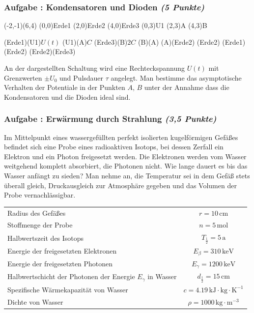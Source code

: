 \documentclass[12pt,a4paper]{article}
\newcommand{\unit}[1]{\,\mathrm{#1}}
\newcommand{\skizze}[1]{
\begin{center}
#1
\end{center}
}
\newcounter{numlabel}
\newenvironment{problem}[2]{\stepcounter{numlabel} \vspace{1ex} \subsubsection*{Aufgabe \the\value{numlabel}: #1 \emph{(#2 Punkte)}} \renewcommand{\Currentlabel}{Aufgabe \the\value{numlabel}: #1}}{

}
\begin{document}
\begin{problem}{Kondensatoren und Dioden}{5}
\skizze{
\begin{pspicture}(-2,-1)(6,4)
\pnode(0,0){Erde1}
\pnode(2,0){Erde2}
\pnode(4,0){Erde3}
\pnode(0,3){U1}
\pnode(2,3){A}
\pnode(4,3){B}

\tension[labeloffset=1](Erde1)(U1){$U(t)$}
\capacitor[labeloffset=-1](U1)(A){$C$}
\capacitor[labeloffset=-1](Erde3)(B){$2 C$}
\diode(B)(A){}
\diode(A)(Erde2){}
\ground(Erde2)
\wire(Erde1)(Erde2)
\wire(Erde2)(Erde3)
\nput{90}{A}{$A$}
\nput{90}{B}{$B$}
\end{pspicture}
}
An der dargestellten Schaltung wird eine Rechteckspannung $U(t)$ mit Grenzwerten $\pm U_0$ und Pulsdauer $\tau$ angelegt. Man bestimme das asymptotische Verhalten der Potentiale in der Punkten $A$, $B$ unter der Annahme dass die Kondensatoren und die Dioden ideal sind.
\end{problem}

\begin{problem}{Erwärmung durch Strahlung}{3,5}
Im Mittelpunkt eines wassergefüllten perfekt isolierten kugelförmigen Gefäßes befindet sich eine Probe eines radioaktiven Isotops, bei dessen Zerfall ein Elektron und ein Photon freigesetzt werden. Die Elektronen werden vom Wasser weitgehend komplett absorbiert, die Photonen nicht. Wie lange dauert es bis das Wasser anfängt zu sieden? Man nehme an, die Temperatur sei in dem Gefäß stets überall gleich, Druckausgleich zur Atmosphäre gegeben und das Volumen der Probe vernachlässigbar.
\begin{center}
\begin{tabular}{lc}
\toprule
Radius des Gefäßes & $r = 10 \unit{cm}$\\
Stoffmenge der Probe & $n = 5 \unit{mol}$\\
Halbwertszeit des Isotops & $T_{\frac12} = 5 \unit{a}$\\
Energie der freigesetzten Elektronen & $E_\beta = 310 \unit{keV}$\\
Energie der freigesetzten Photonen & $E_\gamma = 1200 \unit{keV}$\\
Halbwertschicht der Photonen der Energie $E_\gamma$ in Wasser & $d_{\frac12} = 15 \unit{cm}$\\
Spezifische Wärmekapazität von Wasser & $c = 4.19 \unit{kJ \cdot kg \cdot K^{-1}}$\\
Dichte von Wasser & $\rho = 1000 \unit{kg \cdot m^{-3}}$
\bottomrule
\end{tabular}
\end{center}
\end{problem}
\end{document}
